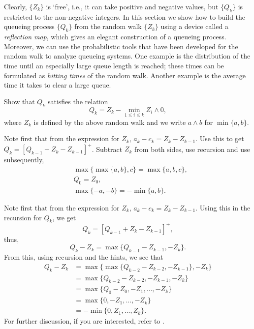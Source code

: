 Clearly, $\{Z_k\}$ is `free', i.e., it can take positive and negative
values, but $\{Q_k\}$ is restricted to the non-negative integers.  In
this section we show how to build the queueing process $\{Q_k\}$ from
the random walk $\{Z_k\}$ using a device called a \emph{reflection map}, which gives an  elegant construction of a queueing process. Moreover, we can use the probabilistic
tools that have been developed for the random walk to analyze queueing
systems. One example is the distribution of the time until an
especially large queue length is reached; these times can be
formulated as \emph{hitting times} of the random walk. Another example
is the average time it takes to clear a large queue.

\begin{exercise}[\faCalculator]
Show that  $Q_k$ satisfies the relation
\begin{equation}\label{eq:reich1}
  Q_k = Z_k - \min_{1\leq i \leq k} Z_i\wedge 0,
\end{equation}
where $Z_k$ is defined by the above random walk and
we write $a\wedge b$ for $\min\{a,b\}$.
\begin{hint}
Note first that from the expression for $Z_k$,
  $a_k - c_k = Z_k - Z_{k-1}$. Use this to get
  $Q_k = [Q_{k-1} +Z_k- Z_{k-1}]^+$. Subtract $Z_k$ from both sides, use recursion and
  use subsequently,
\begin{align*}
&\max\{\max\{a,b\}, c\} = \max\{a,b,c\}, \\
&Q_0 = Z_0, \\
&\max\{-a, -b \} = -\min\{a,b\}.
\end{align*}
\end{hint}
\begin{solution}
Note first that from the expression
for $Z_k$, $a_k - c_k = Z_k - Z_{k-1}$. Using this in the recursion
for $Q_k$, we get
\begin{equation*}
  Q_k = [Q_{k-1} +Z_k- Z_{k-1}]^+,
\end{equation*}
thus, 
\begin{equation*}
  Q_k - Z_{k} = \max\{Q_{k-1} - Z_{k-1}, -Z_k\}.
\end{equation*}
From this, using recursion and the hints, we see that
\begin{equation*}
  \begin{split}
  Q_k - Z_{k} 
&= \max\{\max\{Q_{k-2} - Z_{k-2}, -Z_{k-1}\}, -Z_k\} \\
&= \max\{Q_{k-2} - Z_{k-2}, -Z_{k-1}, -Z_k\} \\
&= \max\{Q_{0} - Z_{0}, -Z_1, \ldots, -Z_k\} \\
&= \max\{0, -Z_1, \ldots, -Z_k\} \\
&= - \min\{0, Z_1, \ldots, Z_k\}.
  \end{split}
  \end{equation*}
For further discussion, if you are interested, refer to
  \citet{baccelli88:_sampl_m_m}.
\end{solution}
\end{exercise}

